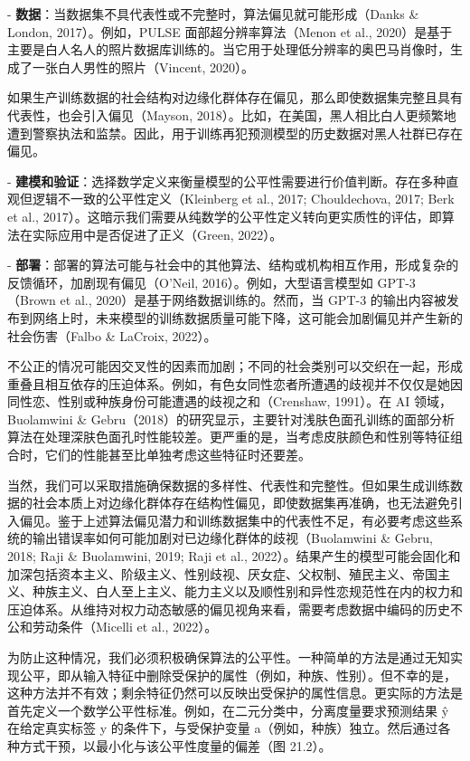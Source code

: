 \documentclass[lang=cn,newtx,10pt,scheme=chinese]{elegantbook}
\begin{document}
- \textbf{数据}：当数据集不具代表性或不完整时，算法偏见就可能形成（Danks \& London, 2017）。例如，PULSE 面部超分辨率算法（Menon et al., 2020）是基于主要是白人名人的照片数据库训练的。当它用于处理低分辨率的奥巴马肖像时，生成了一张白人男性的照片（Vincent, 2020）。

如果生产训练数据的社会结构对边缘化群体存在偏见，那么即使数据集完整且具有代表性，也会引入偏见（Mayson, 2018）。比如，在美国，黑人相比白人更频繁地遭到警察执法和监禁。因此，用于训练再犯预测模型的历史数据对黑人社群已存在偏见。

- \textbf{建模和验证}：选择数学定义来衡量模型的公平性需要进行价值判断。存在多种直观但逻辑不一致的公平性定义（Kleinberg et al., 2017; Chouldechova, 2017; Berk et al., 2017）。这暗示我们需要从纯数学的公平性定义转向更实质性的评估，即算法在实际应用中是否促进了正义（Green, 2022）。

- \textbf{部署}：部署的算法可能与社会中的其他算法、结构或机构相互作用，形成复杂的反馈循环，加剧现有偏见（O’Neil, 2016）。例如，大型语言模型如 GPT-3（Brown et al., 2020）是基于网络数据训练的。然而，当 GPT-3 的输出内容被发布到网络上时，未来模型的训练数据质量可能下降，这可能会加剧偏见并产生新的社会伤害（Falbo \& LaCroix, 2022）。

不公正的情况可能因交叉性的因素而加剧；不同的社会类别可以交织在一起，形成重叠且相互依存的压迫体系。例如，有色女同性恋者所遭遇的歧视并不仅仅是她因同性恋、性别或种族身份可能遭遇的歧视之和（Crenshaw, 1991）。在 AI 领域，Buolamwini \& Gebru（2018）的研究显示，主要针对浅肤色面孔训练的面部分析算法在处理深肤色面孔时性能较差。更严重的是，当考虑皮肤颜色和性别等特征组合时，它们的性能甚至比单独考虑这些特征时还要差。

当然，我们可以采取措施确保数据的多样性、代表性和完整性。但如果生成训练数据的社会本质上对边缘化群体存在结构性偏见，即使数据集再准确，也无法避免引入偏见。鉴于上述算法偏见潜力和训练数据集中的代表性不足，有必要考虑这些系统的输出错误率如何可能加剧对已边缘化群体的歧视（Buolamwini \& Gebru, 2018; Raji \& Buolamwini, 2019; Raji et al., 2022）。结果产生的模型可能会固化和加深包括资本主义、阶级主义、性别歧视、厌女症、父权制、殖民主义、帝国主义、种族主义、白人至上主义、能力主义以及顺性别和异性恋规范性在内的权力和压迫体系。从维持对权力动态敏感的偏见视角来看，需要考虑数据中编码的历史不公和劳动条件（Micelli et al., 2022）。

为防止这种情况，我们必须积极确保算法的公平性。一种简单的方法是通过无知实现公平，即从输入特征中删除受保护的属性（例如，种族、性别）。但不幸的是，这种方法并不有效；剩余特征仍然可以反映出受保护的属性信息。更实际的方法是首先定义一个数学公平性标准。例如，在二元分类中，分离度量要求预测结果 ŷ 在给定真实标签 y 的条件下，与受保护变量 a（例如，种族）独立。然后通过各种方式干预，以最小化与该公平性度量的偏差（图 21.2）。
\end{document}
